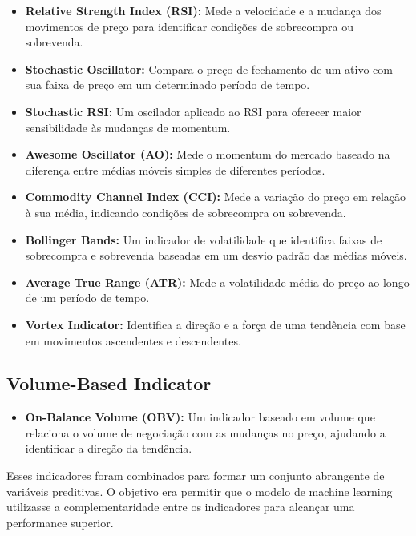 \documentclass{article}
\begin{document}
\begin{itemize}
    \item \textbf{Relative Strength Index (RSI):} Mede a velocidade e a mudança dos movimentos de preço para identificar condições de sobrecompra ou sobrevenda.

    \item \textbf{Stochastic Oscillator:} Compara o preço de fechamento de um ativo com sua faixa de preço em um determinado período de tempo.

    \item \textbf{Stochastic RSI:} Um oscilador aplicado ao RSI para oferecer maior sensibilidade às mudanças de momentum.

    \item \textbf{Awesome Oscillator (AO):} Mede o momentum do mercado baseado na diferença entre médias móveis simples de diferentes períodos.

    \item \textbf{Commodity Channel Index (CCI):} Mede a variação do preço em relação à sua média, indicando condições de sobrecompra ou sobrevenda.

    \item \textbf{Bollinger Bands:} Um indicador de volatilidade que identifica faixas de sobrecompra e sobrevenda baseadas em um desvio padrão das médias móveis.

    \item \textbf{Average True Range (ATR):} Mede a volatilidade média do preço ao longo de um período de tempo.

    \item \textbf{Vortex Indicator:} Identifica a direção e a força de uma tendência com base em movimentos ascendentes e descendentes.
\end{itemize}

\subsection{Volume-Based Indicator}

\begin{itemize}
    \item \textbf{On-Balance Volume (OBV):} Um indicador baseado em volume que relaciona o volume de negociação com as mudanças no preço, ajudando a identificar a direção da tendência.
\end{itemize}

Esses indicadores foram combinados para formar um conjunto abrangente de variáveis preditivas. O objetivo era permitir que o modelo de machine learning utilizasse a complementaridade entre os indicadores para alcançar uma performance superior.
\end{document}
